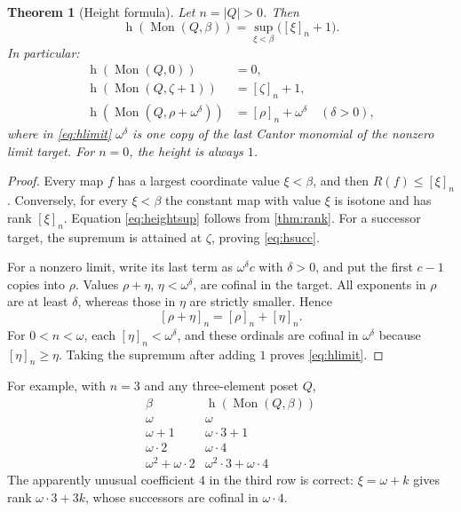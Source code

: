 \documentclass[11pt,a4paper]{article}
\newtheorem{theorem}{Theorem}[section]
\theoremstyle{definition}
\theoremstyle{remark}
\newcommand{\Mon}{\operatorname{Mon}}
\newcommand{\height}{\operatorname{h}}
\newcommand{\Nrep}[2]{\left[#1\right]_{#2}}
\begin{document}
\begin{theorem}[Height formula]\label{thm:height}
Let $n=|Q|>0$. Then
\begin{equation}\label{eq:heightsup}
 \boxed{\height(\Mon(Q,\beta))
       =\sup_{\xi<\beta}\bigl(\Nrep{\xi}{n}+1\bigr).}
\end{equation}
In particular:
\begin{align}
 \height(\Mon(Q,0))&=0,\label{eq:hzero}\\
 \height(\Mon(Q,\zeta+1))&=\Nrep{\zeta}{n}+1,\label{eq:hsucc}\\
 \height(\Mon(Q,\rho+\omega^\delta))
   &=\Nrep{\rho}{n}+\omega^\delta
       \quad(\delta>0),\label{eq:hlimit}
\end{align}
where in \eqref{eq:hlimit} $\omega^\delta$ is one copy of the last Cantor
monomial of the nonzero limit target. For $n=0$, the height is always $1$.
\end{theorem}
\begin{proof}
Every map $f$ has a largest coordinate value $\xi<\beta$, and then
$R(f)\leq\Nrep{\xi}{n}$. Conversely, for every $\xi<\beta$ the constant
map with value $\xi$ is isotone and has rank $\Nrep{\xi}{n}$. Equation
\eqref{eq:heightsup} follows from \cref{thm:rank}. For a successor target,
the supremum is attained at $\zeta$, proving \eqref{eq:hsucc}.

For a nonzero limit, write its last term as $\omega^\delta c$ with
$\delta>0$, and put the first $c-1$ copies into $\rho$. Values
$\rho+\eta$, $\eta<\omega^\delta$, are cofinal in the target. All
exponents in $\rho$ are at least $\delta$, whereas those in $\eta$ are
strictly smaller. Hence
\[
 \Nrep{\rho+\eta}{n}=\Nrep{\rho}{n}+\Nrep{\eta}{n}.
\]
For $0<n<\omega$, each $\Nrep{\eta}{n}<\omega^\delta$, and these
ordinals are cofinal in $\omega^\delta$ because
$\Nrep{\eta}{n}\geq\eta$. Taking the supremum after adding $1$ proves
\eqref{eq:hlimit}.
\end{proof}

For example, with $n=3$ and any three-element poset $Q$,
\[
\begin{array}{c|c}
\beta&\height(\Mon(Q,\beta))\\\hline
\omega&\omega\\
\omega+1&\omega\cdot3+1\\
\omega\cdot2&\omega\cdot4\\
\omega^2+\omega\cdot2&\omega^2\cdot3+\omega\cdot4
\end{array}
\]
The apparently unusual coefficient $4$ in the third row is correct:
$\xi=\omega+k$ gives rank $\omega\cdot3+3k$, whose successors are cofinal
in $\omega\cdot4$.
\end{document}

